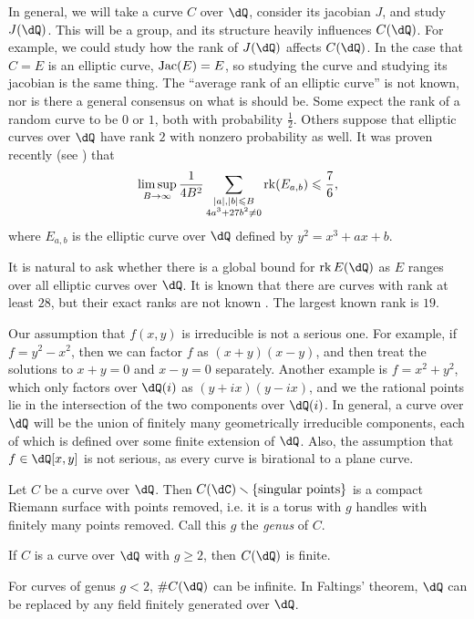 \documentclass{article}
\begin{document}
In general, we will take a curve $C$ over $\dQ$, consider its jacobian $J$, and study 
$J(\dQ)$. This will be a group, and its structure heavily influences $C(\dQ)$. 
For example, we could study how the rank of $J(\dQ)$ affects $C(\dQ)$. In the 
case that $C=E$ is an elliptic curve, $\operatorname{Jac}(E)=E$, so studying the curve and 
studying its jacobian is the same thing. The ``average rank of an elliptic 
curve'' is not known, nor is there a general consensus on what is should be. 
Some expect the rank of a random curve to be $0$ or $1$, both with 
probability $\frac 1 2$. Others suppose that elliptic curves over $\dQ$ have 
rank $2$ with nonzero probability as well. It was proven recently (see 
\cite[\S 1]{bh10}) that 
\[
  \limsup_{B\to\infty} \frac{1}{4 B^2} \sum_{\substack{|a|,|b|\leqslant B \\ 4 a^3+27 b^2\ne 0}} \operatorname{rk}(E_{a,b}) \leqslant\frac 7 6 \text{,}
\]
where $E_{a,b}$ is the elliptic curve over $\dQ$ defined by $y^2=x^3 +a x+b$.

It is natural to ask whether there is a global bound for $\rank E(\dQ)$ as 
$E$ ranges over all elliptic curves over $\dQ$. 
It is known that there are curves with rank at least $28$, but their exact 
ranks are not known \cite{du}. The largest known rank is $19$.  

Our assumption that $f(x,y)$ is irreducible is not a serious one. For example, 
if $f=y^2-x^2$, then we can factor $f$ as $(x+y)(x-y)$, and then treat the 
solutions to $x+y=0$ and $x-y=0$ separately. Another example is $f=x^2+y^2$, 
which only factors over $\dQ(i)$ as $(y+i x)(y-i x)$, and we the rational 
points lie in the intersection of the two components over $\dQ(i)$. In general, 
a curve over $\dQ$ will be the union of finitely many geometrically irreducible 
components, each of which is defined over some finite extension of $\dQ$. Also, 
the assumption that $f\in \dQ[x,y]$ is not serious, as every curve is 
birational to a plane curve. 

Let $C$ be a curve over $\dQ$. Then 
$C(\dC)\smallsetminus \{\text{singular points}\}$ is a compact Riemann 
surface with points removed, i.e. it is a torus with $g$ handles with finitely 
many points removed. Call this $g$ the \emph{genus} of $C$. 

\begin{theorem}
If $C$ is a curve over $\dQ$ with $g\geqslant 2$, then $C(\dQ)$ 
is finite. 
\end{theorem}

For curves of genus $g<2$, $\# C(\dQ)$ can be infinite. In Faltings' 
theorem, $\dQ$ can be replaced by any field finitely generated over 
$\dQ$. 
\end{document}
